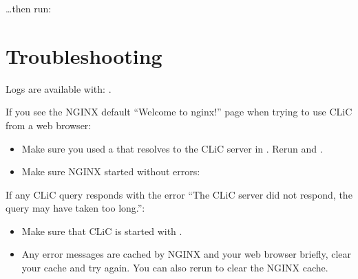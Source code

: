 \documentclass[letterpaper,10pt,english]{sphinxmanual}
\begin{document}
\begin{sphinxVerbatim}[commandchars=\\\{\}]
     
\end{sphinxVerbatim}

\sphinxAtStartPar
…then run:

\begin{sphinxVerbatim}[commandchars=\\\{\}]
 
\end{sphinxVerbatim}


\section{Troubleshooting}
\label{\detokenize{advanced/production:troubleshooting}}
\sphinxAtStartPar
Logs are available with: .

\sphinxAtStartPar
If you see the NGINX default “Welcome to nginx!” page when trying to use CLiC from a web browser:
\begin{itemize}
\item {} 
\sphinxAtStartPar
Make sure you used a  that resolves to the CLiC server in . Re\sphinxhyphen{}run  and .

\item {} 
\sphinxAtStartPar
Make sure NGINX started without errors: 

\end{itemize}

\sphinxAtStartPar
If any CLiC query responds with the error “The CLiC server did not respond, the query may have taken too long.”:
\begin{itemize}
\item {} 
\sphinxAtStartPar
Make sure that CLiC is started with .

\item {} 
\sphinxAtStartPar
Any error messages are cached by NGINX and your web browser briefly, clear your cache and try again. You can also re\sphinxhyphen{}run  to clear the NGINX cache.

\end{itemize}
\end{document}
